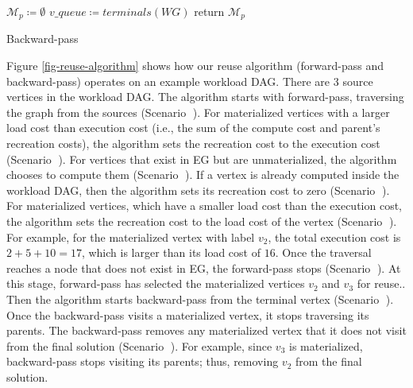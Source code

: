 \begin{algorithm}[h]
$\mathcal{M}_p \coloneqq \emptyset$\;
$v\_queue \coloneqq terminals(WG)$\;
return $\mathcal{M}_p$\;
\caption{Backward-pass}\label{backward-pass}
\end{algorithm}

Figure \ref{fig-reuse-algorithm} shows how our reuse algorithm (forward-pass and backward-pass) operates on an example workload DAG.
There are 3 source vertices in the workload DAG.
The algorithm starts with forward-pass, traversing the graph from the sources (Scenario \textcircled{}).
For materialized vertices with a larger load cost than execution cost (i.e., the sum of the compute cost and parent's recreation costs), the algorithm sets the recreation cost to the execution cost (Scenario \textcircled{}).
For vertices that exist in EG but are unmaterialized, the algorithm chooses to compute them (Scenario \textcircled{}).
If a vertex is already computed inside the workload DAG, then the algorithm sets its recreation cost to zero (Scenario \textcircled{}).
For materialized vertices, which have a smaller load cost than the execution cost, the algorithm sets the recreation cost to the load cost of the vertex (Scenario \textcircled{}).
For example, for the materialized vertex with label $v_2$, the total execution cost is $2 + 5 + 10 = 17$, which is larger than its load cost of $16$.
Once the traversal reaches a node that does not exist in EG, the forward-pass stops (Scenario \textcircled{}).
At this stage, forward-pass has selected the materialized vertices $v_2$ and $v_3$ for reuse..
Then the algorithm starts backward-pass from the terminal vertex (Scenario \textcircled{}).
Once the backward-pass visits a materialized vertex, it stops traversing its parents.
The backward-pass removes any materialized vertex that it does not visit from the final solution (Scenario \textcircled{}).
For example, since $v_3$ is materialized, backward-pass stops visiting its parents; thus, removing $v_2$ from the final solution.

